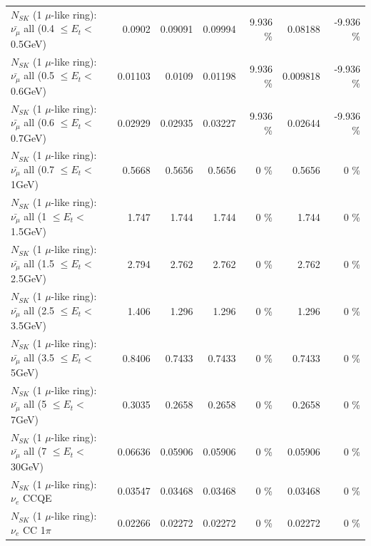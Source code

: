 \begin{table}
\begin{tabular}{| l | r | r | r  r | r  r |}
 $N_{SK}$ (1 $\mu$-like ring): $\bar{\nu_{\mu}}$ all (0.4 $\leq E_{t} <$ 0.5GeV) &          0.0902 &         0.09091 &         0.09994 &    9.936 \%  &         0.08188 &   -9.936 \%  \\ 
 $N_{SK}$ (1 $\mu$-like ring): $\bar{\nu_{\mu}}$ all (0.5 $\leq E_{t} <$ 0.6GeV) &         0.01103 &          0.0109 &         0.01198 &    9.936 \%  &        0.009818 &   -9.936 \%  \\ 
 $N_{SK}$ (1 $\mu$-like ring): $\bar{\nu_{\mu}}$ all (0.6 $\leq E_{t} <$ 0.7GeV) &         0.02929 &         0.02935 &         0.03227 &    9.936 \%  &         0.02644 &   -9.936 \%  \\ 
   $N_{SK}$ (1 $\mu$-like ring): $\bar{\nu_{\mu}}$ all (0.7 $\leq E_{t} <$ 1GeV) &          0.5668 &          0.5656 &          0.5656 &        0 \%  &          0.5656 &        0 \%  \\ 
   $N_{SK}$ (1 $\mu$-like ring): $\bar{\nu_{\mu}}$ all (1 $\leq E_{t} <$ 1.5GeV) &           1.747 &           1.744 &           1.744 &        0 \%  &           1.744 &        0 \%  \\ 
 $N_{SK}$ (1 $\mu$-like ring): $\bar{\nu_{\mu}}$ all (1.5 $\leq E_{t} <$ 2.5GeV) &           2.794 &           2.762 &           2.762 &        0 \%  &           2.762 &        0 \%  \\ 
 $N_{SK}$ (1 $\mu$-like ring): $\bar{\nu_{\mu}}$ all (2.5 $\leq E_{t} <$ 3.5GeV) &           1.406 &           1.296 &           1.296 &        0 \%  &           1.296 &        0 \%  \\ 
   $N_{SK}$ (1 $\mu$-like ring): $\bar{\nu_{\mu}}$ all (3.5 $\leq E_{t} <$ 5GeV) &          0.8406 &          0.7433 &          0.7433 &        0 \%  &          0.7433 &        0 \%  \\ 
     $N_{SK}$ (1 $\mu$-like ring): $\bar{\nu_{\mu}}$ all (5 $\leq E_{t} <$ 7GeV) &          0.3035 &          0.2658 &          0.2658 &        0 \%  &          0.2658 &        0 \%  \\ 
    $N_{SK}$ (1 $\mu$-like ring): $\bar{\nu_{\mu}}$ all (7 $\leq E_{t} <$ 30GeV) &         0.06636 &         0.05906 &         0.05906 &        0 \%  &         0.05906 &        0 \%  \\ 
\hline
\hline
\hline
                                      $N_{SK}$ (1 $\mu$-like ring): $\nu_e$ CCQE &         0.03547 &         0.03468 &         0.03468 &        0 \%  &         0.03468 &        0 \%  \\ 
                                 $N_{SK}$ (1 $\mu$-like ring): $\nu_e$ CC 1$\pi$ &         0.02266 &         0.02272 &         0.02272 &        0 \%  &         0.02272 &        0 \%  \\ 

\end{tabular}
\end{table}
